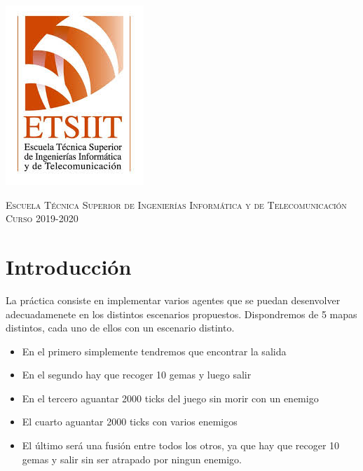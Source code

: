 \documentclass[11pt,a4paper]{article}
\begin{document}
\begin{titlepage}
\begin{minipage}{\textwidth}
\includegraphics[scale=0.3]{img/etsiit.jpeg}

\vspace{0.7cm}
\textsc{Escuela Técnica Superior de Ingenierías Informática y de Telecomunicación}\\
\vspace{1cm}
\textsc{Curso 2019-2020}
\end{minipage}
\end{titlepage}

\tableofcontents
\thispagestyle{empty}				%

\newpage

\setlength{\parskip}{1em}
\setcounter{page}{1}


\section{Introducción}

La práctica consiste en implementar varios agentes que se puedan desenvolver adecuadamenete en los
distintos escenarios propuestos. Dispondremos de 5 mapas distintos, cada uno de ellos con un escenario
distinto.

\begin{itemize}
    \item En el primero simplemente tendremos que encontrar la salida
    \item En el segundo hay que recoger 10 gemas y luego salir
    \item En el tercero aguantar 2000 ticks del juego sin morir con un enemigo
    \item El cuarto aguantar 2000 ticks con varios enemigos
    \item El último será una fusión entre todos los otros, ya que hay que recoger 10 gemas y salir sin
          ser atrapado por ningun enemigo.
\end{itemize}
\end{document}

